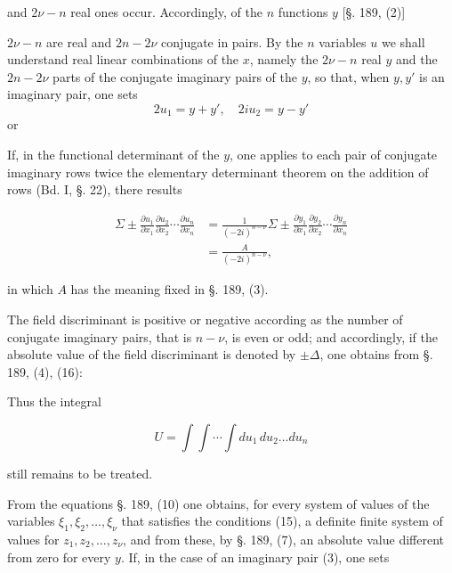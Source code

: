 and $2\nu - n$ real ones occur. Accordingly, of the $n$ functions $y$ [§. 189, (2)]


$2\nu - n$ are real and $2n-2\nu$ conjugate in pairs. By the $n$ variables $u$ we shall understand real linear combinations of the $x$, namely the $2\nu-n$ real $y$ and the $2n-2\nu$ parts of the conjugate imaginary pairs of the $y$, so that, when $y, y'$ is an imaginary pair, one sets
\[
2u_1 = y+y', \quad 2iu_2 = y-y'
\]
or


If, in the functional determinant of the $y$, one applies to each pair of conjugate imaginary rows twice the elementary determinant theorem on the addition of rows (Bd. I, §. 22), there results

\[
\begin{aligned}
\Sigma \pm \frac{\partial u_1}{\partial x_1}\frac{\partial u_2}{\partial x_2}\cdots\frac{\partial u_n}{\partial x_n}
&= \frac{1}{(-2i)^{n-\nu}}\Sigma\pm\frac{\partial y_1}{\partial x_1}\frac{\partial y_2}{\partial x_2}\cdots\frac{\partial y_n}{\partial x_n} \\
&= \frac{A}{(-2i)^{n-\nu}},
\end{aligned}
\]

in which $A$ has the meaning fixed in §. 189, (3).

The field discriminant is positive or negative according as the number of conjugate imaginary pairs, that is $n-\nu$, is even or odd; and accordingly, if the absolute value of the field discriminant is denoted by $\pm\varDelta$, one obtains from §. 189, (4), (16):


Thus the integral

\[
U = \int\int\cdots\int du_1\,du_2\ldots du_n
\]

still remains to be treated.

From the equations §. 189, (10) one obtains, for every system of values of the variables $\xi_1, \xi_2, \ldots, \xi_\nu$ that satisfies the conditions (15), a definite finite system of values for $z_1, z_2, \ldots, z_\nu$, and from these, by §. 189, (7), an absolute value different from zero for every $y$. If, in the case of an imaginary pair (3), one sets


